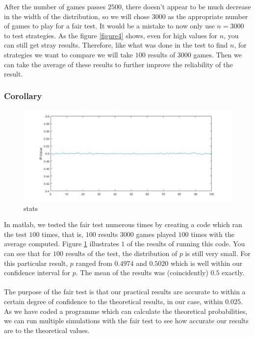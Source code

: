 \documentclass[a4paper,titlepage]{article}
\begin{document}
After the number of games passes $2500$, there doesn’t appear to be much decrease in the width of the distribution, so we will chose $3000$ as the appropriate number of games to play for a fair test. It would be a mistake to now only use $n=3000$ to test strategies. As the figure \ref{figure4} shows, even for high values for $n$, you can still get stray results. Therefore, like what was done in the test to find $n$, for strategies we want to compare we will take $100$ results of $3000$ games. Then we can take the average of these results to further improve the reliability of the result.
\subsubsection{Corollary}
\begin{figure}
\centering
\includegraphics[width=\textwidth]{stats_2}
\caption{stats\label{figure5}}
\end{figure}
In matlab, we tested the fair test numerous times by creating a code which ran the test $100$ times, that is, $100$ results $3000$ games played $100$ times with the average computed. Figure \ref{figure5} illustrates $1$ of the results of running this code. You can see that for $100$ results of the test, the distribution of $p$ is still very small. For this particular result, $p$ ranged from $0.4974$ and $0.5020$ which is well within our confidence interval for $p$. The mean of the results was (coincidently) $0.5$ exactly.\\ \\
The purpose of the fair test is that our practical results are accurate to within a certain degree of confidence to the theoretical results, in our case, within $0.025$. As we have coded a programme which can calculate the theoretical probabilities, we can run multiple simulations with the fair test to see how accurate our results are to the theoretical values.
\end{document}

